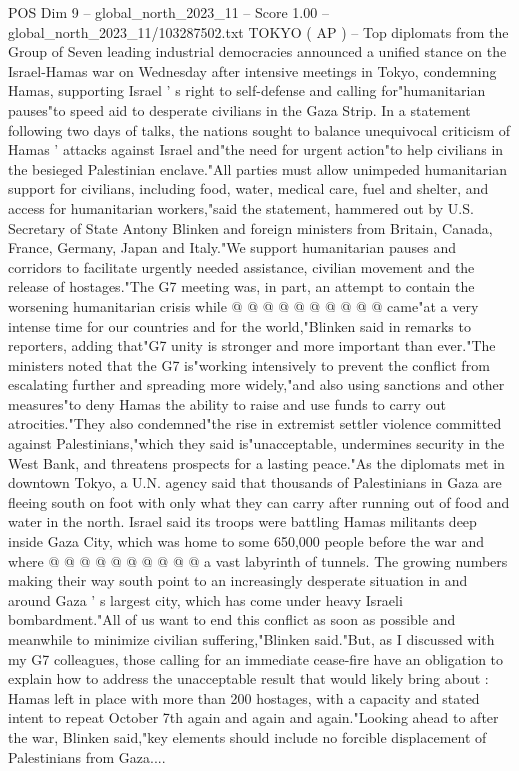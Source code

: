 \begin{textsample}{POS Dim 9 – global\_north\_2023\_11 – Score 1.00 – global\_north\_2023\_11/103287502.txt}  \label{ex:f9_pos_156}
TOKYO ( AP ) -- Top diplomats from the Group of Seven leading industrial democracies announced a unified stance on the Israel-Hamas war on Wednesday after intensive meetings in Tokyo, condemning Hamas, supporting Israel ' s right to self-defense and calling for"humanitarian pauses"to speed aid to desperate civilians in the Gaza Strip.
In a statement following two days of talks, the nations sought to balance unequivocal criticism of Hamas ' attacks against Israel and"the need for urgent action"to help civilians in the besieged Palestinian enclave."All parties must allow unimpeded humanitarian support for civilians, including food, water, medical care, fuel and shelter, and access for humanitarian workers,"said the statement, hammered out by U.S.
Secretary of State Antony Blinken and foreign ministers from Britain, Canada, France, Germany, Japan and Italy."We support humanitarian pauses and corridors to facilitate urgently needed assistance, civilian movement and the release of hostages."The G7 meeting was, in part, an attempt to contain the worsening humanitarian crisis while @ @ @ @ @ @ @ @ @ @ came"at a very intense time for our countries and for the world,"Blinken said in remarks to reporters, adding that"G7 unity is stronger and more important than ever."The ministers noted that the G7 is"working intensively to prevent the conflict from escalating further and spreading more widely,"and also using sanctions and other measures"to deny Hamas the ability to raise and use funds to carry out atrocities."They also condemned"the rise in extremist settler violence committed against Palestinians,"which they said is"unacceptable, undermines security in the West Bank, and threatens prospects for a lasting peace."As the diplomats met in downtown Tokyo, a U.N. agency said that thousands of Palestinians in Gaza are fleeing south on foot with only what they can carry after running out of food and water in the north.
Israel said its troops were battling Hamas militants deep inside Gaza City, which was home to some 650,000 people before the war and where @ @ @ @ @ @ @ @ @ @ a vast labyrinth of tunnels.
The growing numbers making their way south point to an increasingly desperate situation in and around Gaza ' s largest city, which has come under heavy Israeli bombardment."All of us want to end this conflict as soon as possible and meanwhile to minimize civilian suffering,"Blinken said."But, as I discussed with my G7 colleagues, those calling for an immediate cease-fire have an obligation to explain how to address the unacceptable result that would likely bring about : Hamas left in place with more than 200 hostages, with a capacity and stated intent to repeat October 7th again and again and again."Looking ahead to after the war, Blinken said,"key elements should include no forcible displacement of Palestinians from Gaza....

\end{textsample}
